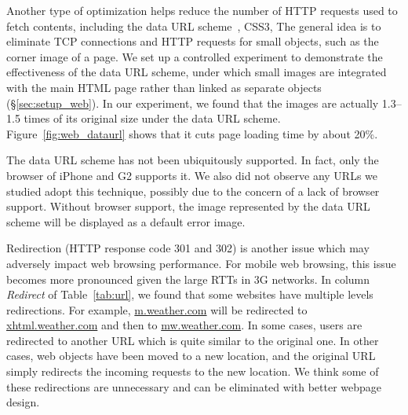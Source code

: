 Another type of optimization helps reduce the number of HTTP 
requests used to fetch contents, including the data URL 
scheme~\cite{rfc2397}, CSS3, \etc The general idea is to eliminate 
TCP connections and HTTP requests for small objects, such as the 
corner image of a page. 
We set up a controlled experiment to 
demonstrate the effectiveness of the data URL scheme, under which 
small images are integrated with the main HTML page rather than 
linked as separate objects (\S\ref{sec:setup_web}). 
In our experiment, we found that the images are actually 1.3--1.5 
times of its original size under the data URL scheme. 
Figure~\ref{fig:web_dataurl} shows that it cuts page loading
time by about 20\%.

The data URL scheme has not been ubiquitously supported. In fact, 
only the browser of iPhone and G2 supports it. We also did not 
observe any URLs we studied adopt this technique, possibly due to the 
concern of a lack of browser support. Without browser support, the 
image represented by the data URL scheme will be displayed as a 
default error image.

Redirection (HTTP response code 301 and 302) is another issue which
may adversely impact web browsing performance. For mobile web browsing, 
this issue becomes more pronounced given the large RTTs in 3G networks. 
In column {\em Redirect} of Table~\ref{tab:url}, we found that some 
websites have multiple levels redirections. For example, 
\url{m.weather.com} will be redirected to \url{xhtml.weather.com} and 
then to \url{mw.weather.com}. In some cases, users are redirected to 
another URL which is quite similar to the original one. In other 
cases, web objects have been moved to a new location, and the original 
URL simply redirects the incoming requests to the new location. We 
think some of these redirections are unnecessary and can be eliminated 
with better webpage design.

%
%
%


